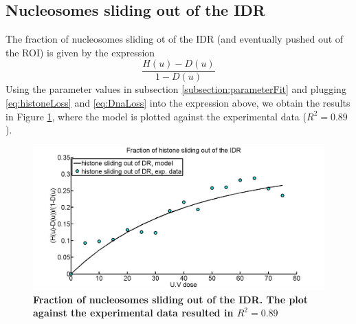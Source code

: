 \documentclass[12pt]{article}
\begin{document}
\subsection{Nucleosomes sliding out of the IDR}
The fraction of nucleosomes sliding ot of the IDR (and eventually pushed out of the ROI) is given by the expression 
\begin{equation}
\frac{H(u)-D(u)}{1-D(u)}
\end{equation}
Using the parameter values in subsection \ref{subsection:parameterFit} and plugging \ref{eq:histoneLoss} and \ref{eq:DnaLoss} into the expression above, we obtain the results in Figure \ref{fig:fractionSlidingOutOfIDR}, where the model is plotted against the experimental data ($R^2=0.89$). 

\begin{figure}[H]
\centering
\includegraphics[width=0.5\linewidth, height=0.3\textheight]{fractionSlidingOutOfIDR}
\caption{\textbf{Fraction of nucleosomes sliding out of the IDR. The plot against the experimental data resulted in $R^2=0.89$ }}
\label{fig:fractionSlidingOutOfIDR}
\end{figure}
\end{document}
